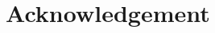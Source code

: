\chapter*{Acknowledgement}
\label{chap:acknowledgement}


\vspace{.2in}
\begin{flushright}
    \usevar{\srsAuthorOne} \\
    \usevar{\srsAuthorTwo} \\
    \usevar{\srsAuthorThree}
\end{flushright}
